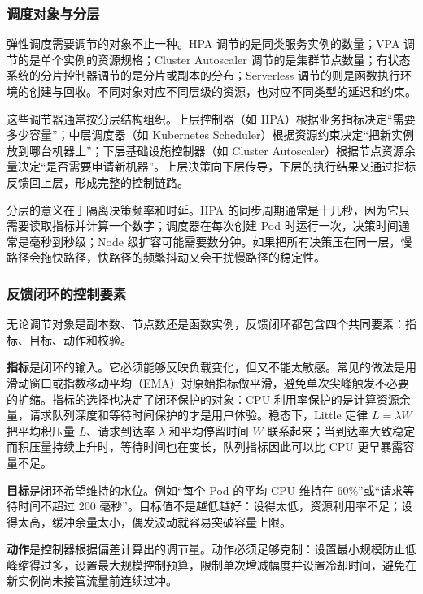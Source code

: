 \subsubsection{调度对象与分层}

弹性调度需要调节的对象不止一种。HPA 调节的是同类服务实例的数量；VPA 调节的是单个实例的资源规格；Cluster Autoscaler 调节的是集群节点数量；有状态系统的分片控制器调节的是分片或副本的分布；Serverless 调节的则是函数执行环境的创建与回收。不同对象对应不同层级的资源，也对应不同类型的延迟和约束。

这些调节器通常按分层结构组织。上层控制器（如 HPA）根据业务指标决定“需要多少容量”；中层调度器（如 Kubernetes Scheduler）根据资源约束决定“把新实例放到哪台机器上”；下层基础设施控制器（如 Cluster Autoscaler）根据节点资源余量决定“是否需要申请新机器”。上层决策向下层传导，下层的执行结果又通过指标反馈回上层，形成完整的控制链路。

分层的意义在于隔离决策频率和时延。HPA 的同步周期通常是十几秒，因为它只需要读取指标并计算一个数字；调度器在每次创建 Pod 时运行一次，决策时间通常是毫秒到秒级；Node 级扩容可能需要数分钟。如果把所有决策压在同一层，慢路径会拖快路径，快路径的频繁抖动又会干扰慢路径的稳定性。

\subsubsection{反馈闭环的控制要素}
\label{sec6:autoscaling-feedback-loop}

无论调节对象是副本数、节点数还是函数实例，反馈闭环都包含四个共同要素：指标、目标、动作和校验。

\textbf{指标}是闭环的输入。它必须能够反映负载变化，但又不能太敏感。常见的做法是用滑动窗口或指数移动平均（EMA）对原始指标做平滑，避免单次尖峰触发不必要的扩缩。指标的选择也决定了闭环保护的对象：CPU 利用率保护的是计算资源余量，请求队列深度和等待时间保护的才是用户体验。稳态下，Little 定律 $L=\lambda W$ 把平均积压量 $L$、请求到达率 $\lambda$ 和平均停留时间 $W$ 联系起来；当到达率大致稳定而积压量持续上升时，等待时间也在变长，队列指标因此可以比 CPU 更早暴露容量不足。

\textbf{目标}是闭环希望维持的水位。例如“每个 Pod 的平均 CPU 维持在 60\%”或“请求等待时间不超过 200 毫秒”。目标值不是越低越好：设得太低，资源利用率不足；设得太高，缓冲余量太小，偶发波动就容易突破容量上限。

\textbf{动作}是控制器根据偏差计算出的调节量。动作必须足够克制：设置最小规模防止低峰缩得过多，设置最大规模控制预算，限制单次增减幅度并设置冷却时间，避免在新实例尚未接管流量前连续过冲。

